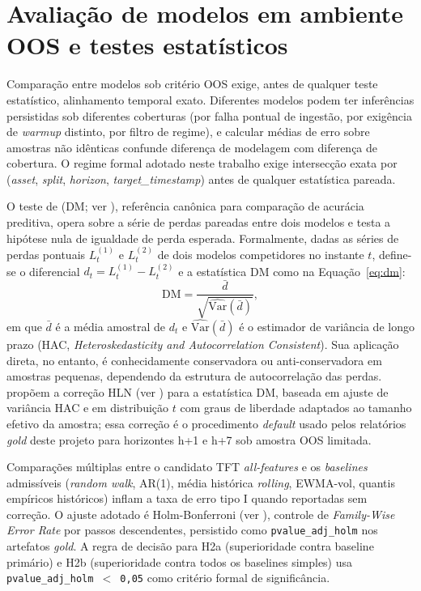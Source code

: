 \section{Avaliação de modelos em ambiente OOS e testes estatísticos}
Comparação entre modelos sob critério OOS exige, antes de qualquer teste estatístico, alinhamento temporal exato. Diferentes modelos podem ter inferências persistidas sob diferentes coberturas (por falha pontual de ingestão, por exigência de \textit{warmup} distinto, por filtro de regime), e calcular médias de erro sobre amostras não idênticas confunde diferença de modelagem com diferença de cobertura. O regime formal adotado neste trabalho exige intersecção exata por (\textit{asset}, \textit{split}, \textit{horizon}, \textit{target\_timestamp}) antes de qualquer estatística pareada.

O teste de \cite{DIEBOLDMARIANO1995} (DM; ver ), referência canônica para comparação de acurácia preditiva, opera sobre a série de perdas pareadas entre dois modelos e testa a hipótese nula de igualdade de perda esperada. Formalmente, dadas as séries de perdas pontuais $L_t^{(1)}$ e $L_t^{(2)}$ de dois modelos competidores no instante $t$, define-se o diferencial $d_t = L_t^{(1)} - L_t^{(2)}$ e a estatística DM como na Equação~\ref{eq:dm}:
\begin{equation}
    \mathrm{DM} = \frac{\bar{d}}{\sqrt{\widehat{\mathrm{Var}}(\bar{d})}},
    \label{eq:dm}
\end{equation}
em que $\bar{d}$ é a média amostral de $d_t$ e $\widehat{\mathrm{Var}}(\bar{d})$ é o estimador de variância de longo prazo (HAC, \textit{Heteroskedasticity and Autocorrelation Consistent}). Sua aplicação direta, no entanto, é conhecidamente conservadora ou anti-conservadora em amostras pequenas, dependendo da estrutura de autocorrelação das perdas. \cite{HARVEY1997} propõem a correção HLN (ver ) para a estatística DM, baseada em ajuste de variância HAC e em distribuição $t$ com graus de liberdade adaptados ao tamanho efetivo da amostra; essa correção é o procedimento \textit{default} usado pelos relatórios \textit{gold} deste projeto para horizontes h+1 e h+7 sob amostra OOS limitada.

Comparações múltiplas entre o candidato TFT \textit{all-features} e os \textit{baselines} admissíveis (\textit{random walk}, AR(1), média histórica \textit{rolling}, EWMA-vol, quantis empíricos históricos) inflam a taxa de erro tipo I quando reportadas sem correção. O ajuste adotado é Holm-Bonferroni (ver ), controle de \textit{Family-Wise Error Rate} por passos descendentes, persistido como \texttt{pvalue\_adj\_holm} nos artefatos \textit{gold}. A regra de decisão para H2a (superioridade contra baseline primário) e H2b (superioridade contra todos os baselines simples) usa \texttt{pvalue\_adj\_holm $<$ 0,05} como critério formal de significância.


